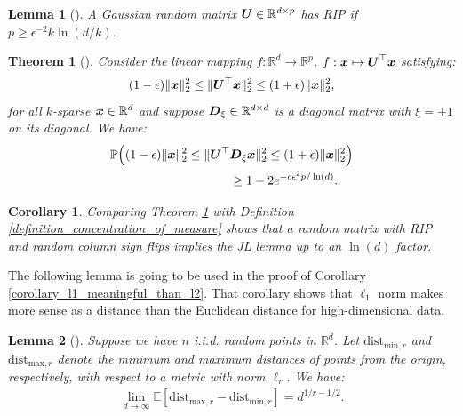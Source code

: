 \documentclass{article}
\newtheorem{theorem}{Theorem}
\newtheorem{lemma}{Lemma}
\newtheorem{corollary}{Corollary}
\def\b{\ensuremath\boldsymbol}
\begin{document}
\begin{lemma}[\cite{candes2006stable}]
A Gaussian random matrix $\b{U} \in \mathbb{R}^{d \times p}$ has RIP if $p \geq \epsilon^{-2} k \ln(d/k)$.
\end{lemma}

\begin{theorem}[\cite{krahmer2011new}]\label{theorem_sparse_diagonal_sign_flip}
Consider the linear mapping $f: \mathbb{R}^d \rightarrow \mathbb{R}^p$, $f: \b{x} \mapsto \b{U}^\top \b{x}$ satisfying: 
\begin{align}
(1 - \epsilon) \|\b{x}\|_2^2 \leq \|\b{U}^\top \b{x}\|_2^2 \leq (1 + \epsilon) \|\b{x}\|_2^2,
\end{align}
for all $k$-sparse $\b{x} \in \mathbb{R}^d$ and suppose $\b{D}_\xi \in \mathbb{R}^{d \times d}$ is a diagonal matrix with $\xi = \pm 1$ on its diagonal. We have:
\begin{align}
\mathbb{P}\Big((1-\epsilon) \|\b{x}\|_2^2 \leq \|\b{U}^\top &\b{D}_\xi \b{x}\|_2^2 \leq (1+\epsilon) \|\b{x}\|_2^2\Big) \nonumber\\
&\geq 1 - 2e^{-c \epsilon^2 p / \ln(d)}.
\end{align}
\end{theorem}

\begin{corollary}
Comparing Theorem \ref{theorem_sparse_diagonal_sign_flip} with Definition \ref{definition_concentration_of_measure} shows that a random matrix with RIP and random column sign flips implies the JL lemma up to an $\ln(d)$ factor. 
\end{corollary}

The following lemma is going to be used in the proof of Corollary \ref{corollary_l1_meaningful_than_l2}. That corollary shows that $\ell_1$ norm makes more sense as a distance than the Euclidean distance for high-dimensional data. 
\begin{lemma}[{\citep[Theorem 2]{hinneburg2000nearest}}]\label{lemma_distance_of_points_wrt_norms}
Suppose we have $n$ i.i.d. random points in $\mathbb{R}^d$. Let $\text{dist}_{\text{min},r}$ and $\text{dist}_{\text{max},r}$ denote the minimum and maximum distances of points from the origin, respectively, with respect to a metric with norm $\ell_r$. We have:
\begin{align}
\lim_{d \rightarrow \infty} \mathbb{E}[\text{dist}_{\text{max},r} - \text{dist}_{\text{min},r}] = d^{1/r - 1/2}.
\end{align}
\end{lemma}
\end{document}
